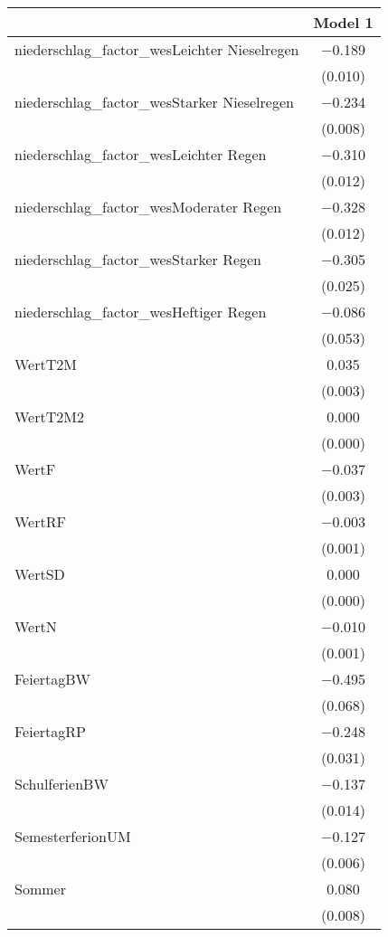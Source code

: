 \begin{table}
\centering
\begin{tabular}[t]{lc}
\toprule
  & Model 1\\
\midrule
niederschlag\_factor\_wesLeichter Nieselregen & \num{-0.189}\\
 & (\num{0.010})\\
niederschlag\_factor\_wesStarker Nieselregen & \num{-0.234}\\
 & \vphantom{1} (\num{0.008})\\
niederschlag\_factor\_wesLeichter Regen & \num{-0.310}\\
 & \vphantom{1} (\num{0.012})\\
niederschlag\_factor\_wesModerater Regen & \num{-0.328}\\
 & (\num{0.012})\\
niederschlag\_factor\_wesStarker Regen & \num{-0.305}\\
 & \vphantom{1} (\num{0.025})\\
niederschlag\_factor\_wesHeftiger Regen & \num{-0.086}\\
 & (\num{0.053})\\
WertT2M & \num{0.035}\\
 & \vphantom{1} (\num{0.003})\\
WertT2M2 & \num{0.000}\\
 & \vphantom{1} (\num{0.000})\\
WertF & \num{-0.037}\\
 & (\num{0.003})\\
WertRF & \num{-0.003}\\
 & \vphantom{1} (\num{0.001})\\
WertSD & \num{0.000}\\
 & (\num{0.000})\\
WertN & \num{-0.010}\\
 & (\num{0.001})\\
FeiertagBW & \num{-0.495}\\
 & (\num{0.068})\\
FeiertagRP & \num{-0.248}\\
 & (\num{0.031})\\
SchulferienBW & \num{-0.137}\\
 & (\num{0.014})\\
SemesterferionUM & \num{-0.127}\\
 & (\num{0.006})\\
Sommer & \num{0.080}\\
 & (\num{0.008})\\

\end{tabular}
\end{table}
